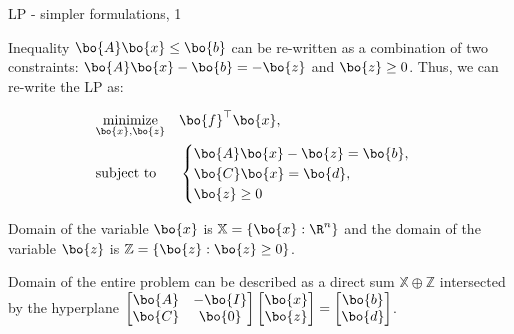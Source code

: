 \documentclass{beamer}
\begin{document}
\begin{frame}{LP - simpler formulations, 1}
	\begin{flushleft}
		
		Inequality $\bo{A}\bo{x} \leq \bo{b}$ can be re-written as a combination of two constraints: $\bo{A}\bo{x} - \bo{b} = -\bo{z}$ and $\bo{z} \geq 0$. Thus, we can re-write the LP as:
		
		
		\begin{equation}
			\begin{aligned}
				& \underset{\bo{x}, \bo{z}}{\text{minimize}}
				& & \bo{f}^\top \bo{x} , \\
				& \text{subject to}
				& & \begin{cases} 
					\bo{A}\bo{x} - \bo{z} = \bo{b}, \\
					\bo{C}\bo{x} = \bo{d}, \\
					\bo{z} \geq 0
				\end{cases}
			\end{aligned}
		\end{equation}
		
		Domain of the variable $\bo{x}$ is $\mathbb{X} = \{ \bo{x}:  \R^n \}$ and the domain of the variable $\bo{z}$ is $\mathbb{Z} = \{ \bo{z}:  \bo{z} \geq 0 \}$.
		
		\bigskip 
		
		Domain of the entire problem can be described as a direct sum $\mathbb{X}  \oplus \mathbb{Z}$ intersected by the hyperplane 
		$
		\begin{bmatrix}
			\bo{A} & - \bo{I} \\
			\bo{C} & \bo{0}
		\end{bmatrix}
		\begin{bmatrix}
			\bo{x} \\
			\bo{z} 
		\end{bmatrix}
		=
		\begin{bmatrix}
			\bo{b} \\
			\bo{d}
		\end{bmatrix}
		$.
		
	\end{flushleft}
\end{frame}
\end{document}
